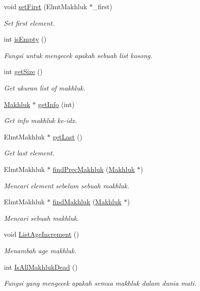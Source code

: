 \begin{DoxyCompactItemize}
void \hyperlink{class_l_makhluk_a4c1e3394813fb95f8850e3f3fe7d9cec}{set\+First} (Elmt\+Makhluk $\ast$\+\_\+first)
\begin{DoxyCompactList}\small\item\em Set first element. \end{DoxyCompactList}\item 
int \hyperlink{class_l_makhluk_a4ce8d0f4664716ac5237c2bd5bf0463e}{is\+Empty} ()
\begin{DoxyCompactList}\small\item\em Fungsi untuk mengecek apakah sebuah list kosong. \end{DoxyCompactList}\item 
int \hyperlink{class_l_makhluk_ad4e2677d64544f3b7d8cae1b919a977c}{get\+Size} ()
\begin{DoxyCompactList}\small\item\em Get ukuran list of makhluk. \end{DoxyCompactList}\item 
\hyperlink{class_makhluk}{Makhluk} $\ast$ \hyperlink{class_l_makhluk_a44a5cabf5f1e4d543ee3a4609a1eb08a}{get\+Info} (int)
\begin{DoxyCompactList}\small\item\em Get info makhluk ke-\/idx. \end{DoxyCompactList}\item 
Elmt\+Makhluk $\ast$ \hyperlink{class_l_makhluk_ac7bd40c1c06471b82f125000efa92add}{get\+Last} ()
\begin{DoxyCompactList}\small\item\em Get last element. \end{DoxyCompactList}\item 
Elmt\+Makhluk $\ast$ \hyperlink{class_l_makhluk_a11328333ff18d44b56eb3ff917340f64}{find\+Prec\+Makhluk} (\hyperlink{class_makhluk}{Makhluk} $\ast$)
\begin{DoxyCompactList}\small\item\em Mencari element sebelum sebuah makhluk. \end{DoxyCompactList}\item 
Elmt\+Makhluk $\ast$ \hyperlink{class_l_makhluk_a41073415d0c395c915ba47099aba7d69}{find\+Makhluk} (\hyperlink{class_makhluk}{Makhluk} $\ast$)
\begin{DoxyCompactList}\small\item\em Mencari sebuah makhluk. \end{DoxyCompactList}\item 
void \hyperlink{class_l_makhluk_ade32d615fb5cdc2593ce146b41e50d04}{List\+Age\+Increment} ()
\begin{DoxyCompactList}\small\item\em Menambah age makhluk. \end{DoxyCompactList}\item 
int \hyperlink{class_l_makhluk_abba02c384ab3bb78cf9d4296eb4eafee}{Is\+All\+Makhluk\+Dead} ()
\begin{DoxyCompactList}\small\item\em Fungsi yang mengecek apakah semua makhluk dalam dunia mati. \end{DoxyCompactList}\end{DoxyCompactItemize}



